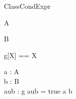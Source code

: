 \begin{zsection}
  \SECTION ClassCondExpr
\end{zsection}

\begin{class}{A}
\end{class}

\begin{class}{B}
\end{class}

\begin{zed}
  g[X] == X
\end{zed}

\begin{axdef}
  a : A\\
  b : B\\
  aub : g
\where
  aub = \IF true \THEN a \ELSE b
\end{axdef}
